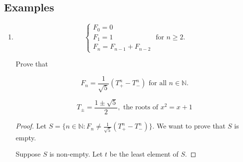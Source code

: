 \documentclass[11pt, draft]{article}
\begin{document}
\subsection{Examples}
\begin{enumerate}

    \item

          \[
              \left\{
              \begin{array}{l}
                  F_0 = 0 \\
                  F_1 = 1 \\
                  F_n = F_{n-1} + F_{n-2}
              \end{array}
              \right. \text{ for } n \geq 2.
          \]

          Prove that

          \[
              F_n = \frac{1}{\sqrt{5}} \left( T_+^n - T_-^n \right) \text{ for all } n \in \mathbb{N}.
          \]

          \[
              T_{\pm} = \frac{1 \pm \sqrt{5}}{2}, \text{ the roots of } x^2 = x + 1
          \]

          \begin{proof} Let $S = \{ n \in \mathbb{N} : F_n \neq \frac{1}{\sqrt{5}} \left( T_+^n - T_-^n \right) \}$. We want to prove that $S$ is empty.

              Suppose $S$ is non-empty. Let $t$ be the least element of $S$.


\end{proof}
\end{enumerate}
\end{document}
